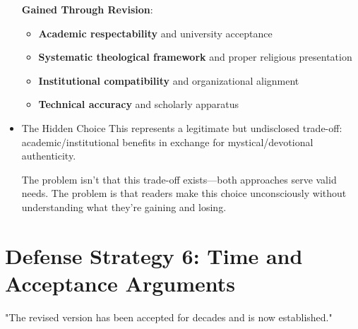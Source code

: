 \documentclass[11pt,twoside]{book}
\begin{document}
\begin{itemize}
\textbf{\textbf{Gained Through Revision}}:
\begin{itemize}
\item \textbf{\textbf{Academic respectability}} and university acceptance
\item \textbf{\textbf{Systematic theological framework}} and proper religious presentation
\item \textbf{\textbf{Institutional compatibility}} and organizational alignment
\item \textbf{\textbf{Technical accuracy}} and scholarly apparatus
\end{itemize}
\item The Hidden Choice
\label{sec:orgfca7579}
This represents a legitimate but undisclosed trade-off: academic/institutional benefits in exchange for mystical/devotional authenticity.

The problem isn't that this trade-off exists—both approaches serve valid needs. The problem is that readers make this choice unconsciously without understanding what they're gaining and losing.
\end{itemize}
\section*{Defense Strategy 6: Time and Acceptance Arguments}
\label{sec:org0fc91ae}

"The revised version has been accepted for decades and is now established."
\end{document}
